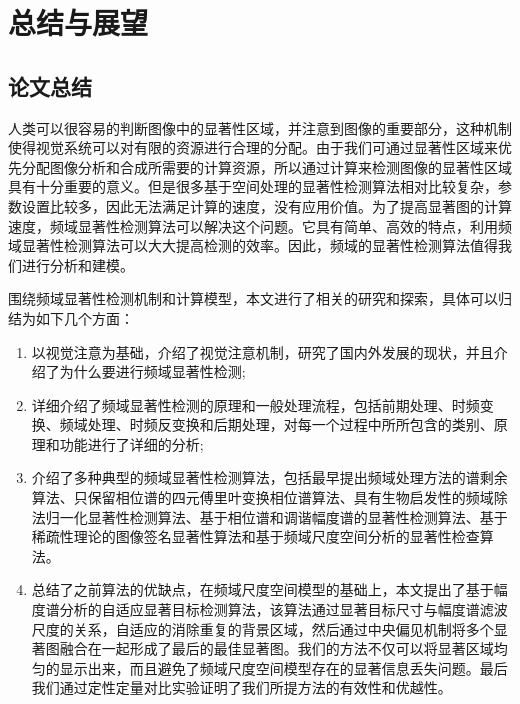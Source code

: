 
\chapter{总结与展望}
\label{cha5}

\section{论文总结}
\label{5_1}

人类可以很容易的判断图像中的显著性区域，并注意到图像的重要部分，这种机制使得视觉系统可以对有限的资源进行合理的分配。由于我们可通过显著性区域来优先分配图像分析和合成所需要的计算资源，所以通过计算来检测图像的显著性区域具有十分重要的意义。但是很多基于空间处理的显著性检测算法相对比较复杂，参数设置比较多，因此无法满足计算的速度，没有应用价值。为了提高显著图的计算速度，频域显著性检测算法可以解决这个问题。它具有简单、高效的特点，利用频域显著性检测算法可以大大提高检测的效率。因此，频域的显著性检测算法值得我们进行分析和建模。

围绕频域显著性检测机制和计算模型，本文进行了相关的研究和探索，具体可以归结为如下几个方面：
\begin{enumerate}
\item 以视觉注意为基础，介绍了视觉注意机制，研究了国内外发展的现状，并且介绍了为什么要进行频域显著性检测;
\item 详细介绍了频域显著性检测的原理和一般处理流程，包括前期处理、时频变换、频域处理、时频反变换和后期处理，对每一个过程中所所包含的类别、原理和功能进行了详细的分析;
\item 介绍了多种典型的频域显著性检测算法，包括最早提出频域处理方法的谱剩余算法、只保留相位谱的四元傅里叶变换相位谱算法、具有生物启发性的频域除法归一化显著性检测算法、基于相位谱和调谐幅度谱的显著性检测算法、基于稀疏性理论的图像签名显著性算法和基于频域尺度空间分析的显著性检查算法。
\item 总结了之前算法的优缺点，在频域尺度空间模型的基础上，本文提出了基于幅度谱分析的自适应显著目标检测算法，该算法通过显著目标尺寸与幅度谱滤波尺度的关系，自适应的消除重复的背景区域，然后通过中央偏见机制将多个显著图融合在一起形成了最后的最佳显著图。我们的方法不仅可以将显著区域均匀的显示出来，而且避免了频域尺度空间模型存在的显著信息丢失问题。最后我们通过定性定量对比实验证明了我们所提方法的有效性和优越性。
\end{enumerate}


